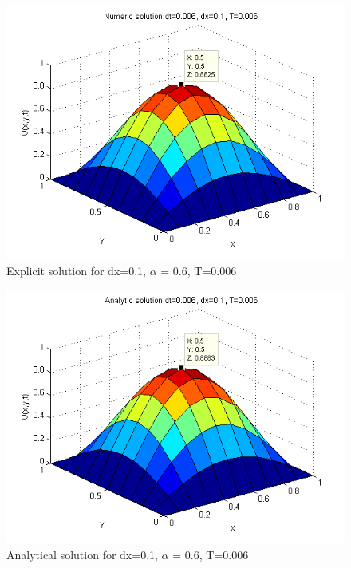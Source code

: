 \documentclass[a4paper,10pt]{article}
\begin{document}
\begin{figure}
  \begin{center}
    \includegraphics[scale=0.5]{num_dt0006_dx01_T0006}
    \caption{Explicit solution for dx=0.1, $\alpha$ = 0.6, T=0.006}
    \label{fig:Num_feil1}
  \end{center}

\end{figure}

\begin{figure}
  \begin{center}
    \includegraphics[scale=0.5]{ana_dt0006_dx01_T0006}
    \caption{Analytical solution for dx=0.1, $\alpha$ = 0.6, T=0.006}
    \label{fig:Ana_feil1}
  \end{center}

\end{figure}
\end{document}
